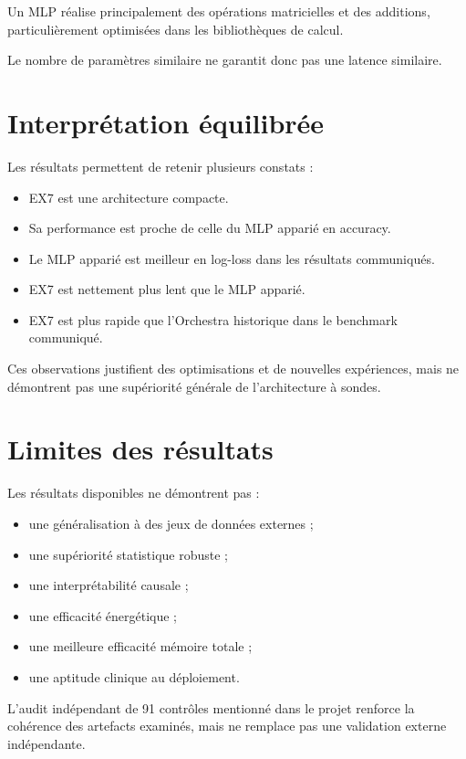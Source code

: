 \documentclass[11pt,a4paper]{report}
\begin{document}
Un MLP réalise principalement des opérations matricielles
et des additions, particulièrement optimisées dans les
bibliothèques de calcul.

Le nombre de paramètres similaire ne garantit donc pas
une latence similaire.

\section{Interprétation équilibrée}

Les résultats permettent de retenir plusieurs constats :

\begin{itemize}
  \item EX7 est une architecture compacte.
  \item Sa performance est proche de celle du MLP apparié
  en accuracy.
  \item Le MLP apparié est meilleur en log-loss dans les
  résultats communiqués.
  \item EX7 est nettement plus lent que le MLP apparié.
  \item EX7 est plus rapide que l'Orchestra historique
  dans le benchmark communiqué.
\end{itemize}

Ces observations justifient des optimisations et de nouvelles
expériences, mais ne démontrent pas une supériorité générale
de l'architecture à sondes.

\section{Limites des résultats}

Les résultats disponibles ne démontrent pas :

\begin{itemize}
  \item une généralisation à des jeux de données externes ;
  \item une supériorité statistique robuste ;
  \item une interprétabilité causale ;
  \item une efficacité énergétique ;
  \item une meilleure efficacité mémoire totale ;
  \item une aptitude clinique au déploiement.
\end{itemize}

L'audit indépendant de 91 contrôles mentionné dans le projet
renforce la cohérence des artefacts examinés, mais ne remplace
pas une validation externe indépendante.
\end{document}
